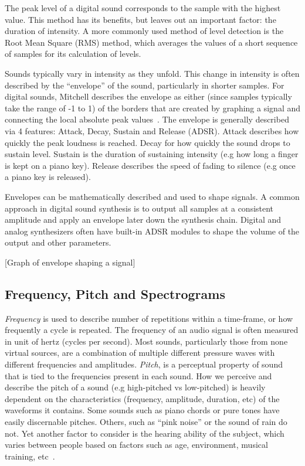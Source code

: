 \documentclass[\main/thesis.tex]{subfiles}
\begin{document}
The peak level of a digital sound corresponds to the sample with the highest value. This method has its benefits, but leaves out an important factor: the duration of intensity. A more commonly used method of level detection is the Root Mean Square (RMS) method, which averages the values of a short sequence of samples for its calculation of levels.

Sounds typically vary in intensity as they unfold. This change in intensity is often described by the \enquote{envelope} of the sound, particularly in shorter samples. For digital sounds, Mitchell describes the envelope as either (since samples typically take the range of -1 to 1) of the borders that are created by graphing a signal and connecting the local absolute peak values~\cite{mitchell2009basicsynthChap6}. The envelope is generally described via 4 features: Attack, Decay, Sustain and Release (ADSR). Attack describes how quickly the peak loudness is reached. Decay for how quickly the sound drops to sustain level. Sustain is the duration of sustaining intensity (e.g how long a finger is kept on a piano key). Release describes the speed of fading to silence (e.g once a piano key is released).

Envelopes can be mathematically described and used to shape signals. A common approach in digital sound synthesis is to output all samples at a consistent amplitude and apply an envelope later down the synthesis chain. Digital and analog synthesizers often have built-in ADSR modules to shape the volume of the output and other parameters.  

[Graph of envelope shaping a signal]
\subsection{Frequency, Pitch and Spectrograms}
\textit{Frequency} is used to describe number of repetitions within a time-frame, or how frequently a cycle is repeated. The frequency of an audio signal is often measured in unit of hertz (cycles per second). Most sounds, particularly those from none virtual sources, are a combination of multiple different pressure waves with different frequencies and amplitudes. \textit{Pitch}, is a perceptual property of sound that is tied to the frequencies present in each sound. How we perceive and describe the pitch of a sound (e.g high-pitched vs low-pitched) is heavily dependent on the characteristics (frequency, amplitude, duration, etc) of the waveforms it contains. Some sounds such as piano chords or pure tones have easily discernable pitches. Others, such as \enquote{pink noise} or the sound of rain do not. Yet another factor to consider is the hearing ability of the subject, which varies between people based on factors such as age, environment, musical training, etc~\cite{reiss2016meta,alain2007age,newman2012grm7}. 
\end{document}
